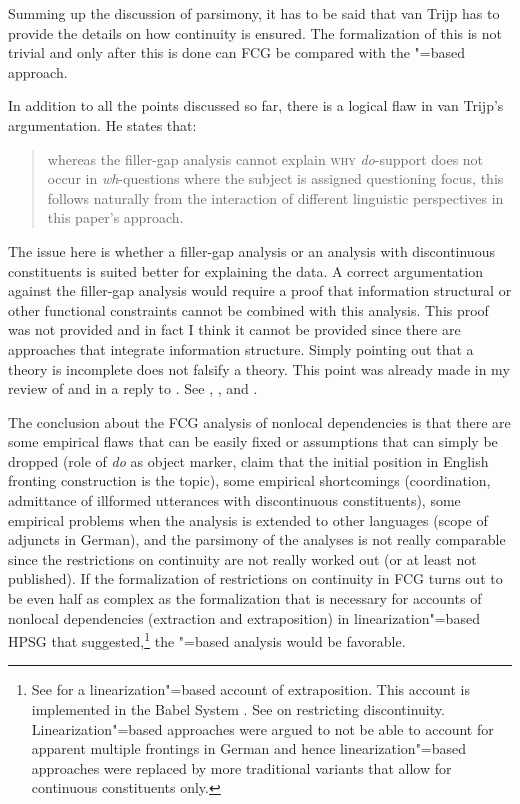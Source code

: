 Summing up the discussion of parsimony, it has to be said that van Trijp has to provide the details
on how continuity is ensured. The formalization of this is not trivial and only after this is done
can FCG be compared with the \slasch"=based approach.

In addition to all the points discussed so far, there is a logical flaw in van Trijp's argumentation.
He states that:
\begin{quote}
whereas the filler-gap analysis cannot explain \textsc{why} \emph{do}-support does not occur
  in \emph{wh}-questions where the subject is assigned questioning focus, this follows naturally
from the interaction of different linguistic perspectives in this paper's
approach. \citep[]{vanTrijp2014a}
\end{quote}
The issue here is whether a filler-gap analysis or an analysis with discontinuous
constituents is suited better for explaining the data. A correct argumentation against the filler-gap analysis would require a proof that information structural or other functional constraints
cannot be combined with this analysis. This proof was not provided and in fact I think it cannot be
provided since there are approaches that integrate information structure. Simply pointing out that a
theory is incomplete does not falsify a theory. This point was already made in my review of
 and in a reply to \citet{Boas2014a}. See ,
, and .

The conclusion about the FCG analysis of nonlocal dependencies is that there are some empirical
flaws that can be easily fixed or assumptions that can simply be dropped (role of \emph{do} as object marker, claim that
the initial position in English fronting construction is the topic), some empirical shortcomings
(coordination, admittance of illformed utterances with discontinuous constituents), some empirical
problems when the analysis is extended to other languages (scope of adjuncts in German), and the
parsimony of the analyses is not really comparable since the restrictions on continuity are not
really worked out (or at least not published). If the formalization of restrictions on continuity in FCG turns out to be even
half as complex as the formalization that is necessary for accounts of nonlocal dependencies
(extraction and extraposition) in linearization"=based HPSG that \citet{Reape2000a}
suggested,\footnote{
  See  for a linearization"=based account of extraposition. This account is
  implemented in the Babel System \citep{Babel}. See \citep{Mueller99h-Eng} on restricting
  discontinuity. Linearization"=based approaches were argued to not be able to account for
  apparent multiple frontings in German \citep{Mueller2005d,MuellerGS} and hence
  linearization"=based approaches were replaced by more traditional variants that allow for
  continuous constituents only.
} the \slasch"=based analysis would be favorable.

